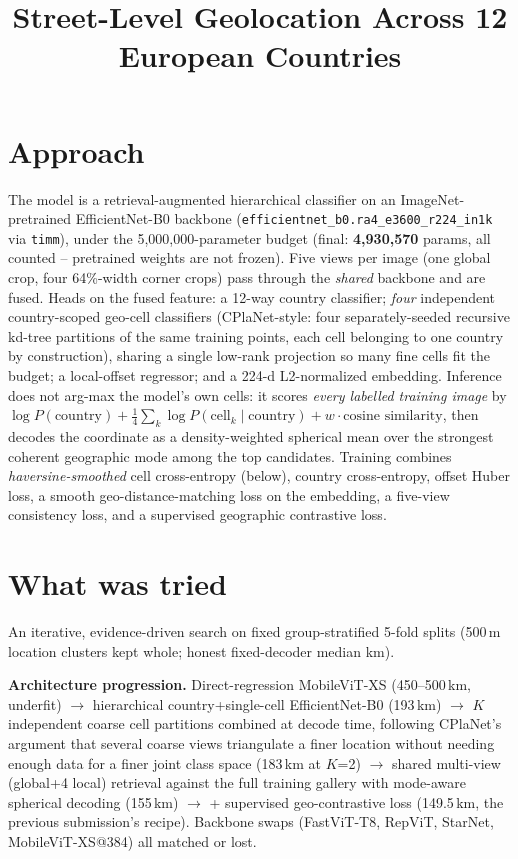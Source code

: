 \documentclass[10pt]{article}
\title{\vspace{-1.5em}Street-Level Geolocation Across 12 European Countries\vspace{-0.5em}}
\author{}
\date{}
\begin{document}
\maketitle
\vspace{-3em}

\section*{Approach}
The model is a retrieval-augmented hierarchical classifier on an ImageNet-pretrained
EfficientNet-B0 backbone (\texttt{efficientnet\_b0.ra4\_e3600\_r224\_in1k} via \texttt{timm}),
under the 5{,}000{,}000-parameter budget (final: \textbf{4{,}930{,}570} params, all counted --
pretrained weights are not frozen). Five views per image (one global crop, four 64\%-width
corner crops) pass through the \emph{shared} backbone and are fused. Heads on the fused
feature: a 12-way country classifier; \emph{four} independent country-scoped geo-cell
classifiers (CPlaNet-style: four separately-seeded recursive kd-tree partitions of the same
training points, each cell belonging to one country by construction), sharing a single
low-rank projection so many fine cells fit the budget; a local-offset regressor; and a
224-d L2-normalized embedding. Inference does not arg-max the model's own cells: it scores
\emph{every labelled training image} by
$\log P(\text{country}) + \tfrac14\sum_k \log P(\text{cell}_k\mid\text{country}) + w\cdot
\text{cosine similarity}$, then decodes the coordinate as a density-weighted spherical mean
over the strongest coherent geographic mode among the top candidates. Training combines
\emph{haversine-smoothed} cell cross-entropy (below), country cross-entropy, offset Huber
loss, a smooth geo-distance-matching loss on the embedding, a five-view consistency loss,
and a supervised geographic contrastive loss.

\section*{What was tried}
An iterative, evidence-driven search on fixed group-stratified 5-fold splits (500\,m
location clusters kept whole; honest fixed-decoder median km).

\textbf{Architecture progression.} Direct-regression MobileViT-XS (450--500\,km, underfit)
$\to$ hierarchical country+single-cell EfficientNet-B0 (193\,km) $\to$ $K$ independent coarse
cell partitions combined at decode time, following CPlaNet's argument that several coarse
views triangulate a finer location without needing enough data for a finer joint class
space (183\,km at $K$=2) $\to$ shared multi-view (global+4 local) retrieval against the full
training gallery with mode-aware spherical decoding (155\,km) $\to$ + supervised
geo-contrastive loss (149.5\,km, the previous submission's recipe). Backbone swaps
(FastViT-T8, RepViT, StarNet, MobileViT-XS@384) all matched or lost.
\end{document}

